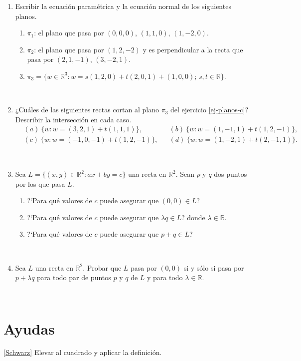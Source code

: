 \documentclass[12pt]{amsart}
\begin{document}
\begin{enumerate}[resume]
\


\item\label{ej-planos} Escribir la ecuaci{\'o}n param\'etrica  y la ecuaci{\'o}n normal de los siguientes planos.
\begin{enumerate}
	\item $\pi_1$: el plano que pasa por $(0,0,0)$, $(1,1,0)$, $(1,-2,0)$.
	\item $\pi_2$: el plano que pasa por $(1,2,-2)$ y es perpendicular a la
	recta que pasa por $(2,1,-1)$, $(3,-2,1)$.
	\item\label{ej-planos-c}  $\pi_3=\{w\in\mathbb{R}^3: w=s(1,2,0)+t(2,0,1)+(1,0,0);\,s,t\in \mathbb R\}$.
\end{enumerate}

\


\item ¿Cu\'ales de las siguientes rectas cortan al plano $\pi_3$ del  ejercicio \eqref{ej-planos-c}?
Describir la intersecci{\'o}n en cada caso.
\begin{align*}
&(a) \ \{w: w=(3,2,1)+t(1,1,1)\}, && (b) \  \{w: w=(1,-1,1)+t(1,2,-1)\}, \\
&(c)\  \{w: w=(-1,0,-1)+t(1,2,-1)\}, && (d) \  \{w: w=(1,-2,1)+t(2,-1,1)\}.
\end{align*}

\

\item\label{rectas como subespacio} Sea $L=\{(x,y)\in\mathbb{R}^2 : ax+by=c\}$ una recta en $\mathbb{R}^2$. Sean $p$ y $q$ dos puntos por los que pasa $L$.
\begin{enumerate}
 \item ?`Para qu\'e valores de $c$ puede asegurar que $(0,0)\in L$?
 \item ?`Para qu\'e valores de $c$ puede asegurar que $\lambda q\in L$? donde $\lambda\in\mathbb{R}$.
 \item ?`Para qu\'e valores de $c$ puede asegurar que $p+q\in L$?
\end{enumerate}


\

\item Sea $L$ una recta en $\mathbb{R}^2$. Probar que $L$ pasa por $(0,0)$ si y s\'olo si pasa por $p+\lambda q$ para todo par de puntos $p$ y $q$ de $L$ y para todo $\lambda\in\mathbb{R}$.
\end{enumerate}

\

\section*{Ayudas}
\eqref{Schwarz} Elevar al cuadrado y aplicar la definici\'on.
\end{document}
